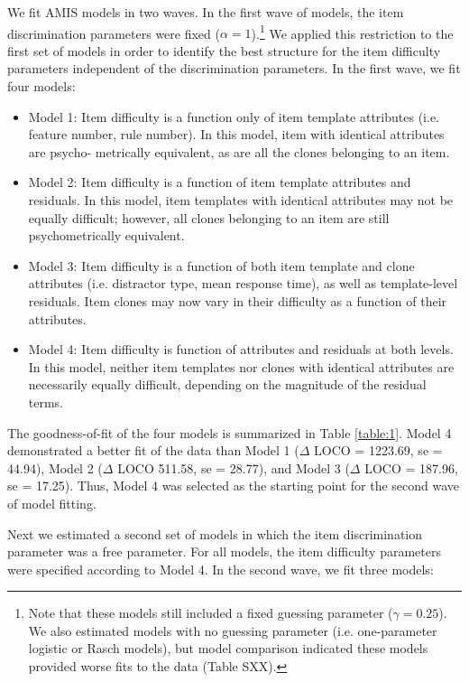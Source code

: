 \documentclass[a4paper,man,natbib]{apa6}
\begin{document}
We fit AMIS models in two waves. In the first wave of models, the item discrimination parameters were fixed ($\alpha = 1$).\footnote{Note that these models still included a fixed guessing parameter ($\gamma = 0.25$). We also estimated models with no guessing parameter (i.e. one-parameter logistic or Rasch models), but model comparison indicated these models provided worse fits to the data (Table SXX).} We applied this restriction to the first set of models in order to identify the best structure for the item difficulty parameters independent of the discrimination parameters. In the first wave, we fit four models:

\begin{itemize}

\item Model 1: Item difficulty is a function only of item template attributes (i.e. feature number, rule number). In this model, item with identical attributes are psycho- metrically equivalent, as are all the clones belonging to an item.

\item Model 2: Item difficulty is a function of item template attributes and residuals. In this model, item templates with identical attributes may not be equally difficult; however, all clones belonging to an item are still psychometrically equivalent.

\item Model 3: Item difficulty is a function of both item template and clone attributes (i.e. distractor type, mean response time), as well as template-level residuals. Item clones may now vary in their difficulty as a function of their attributes.  

\item Model 4: Item difficulty is function of attributes and residuals at both levels. In this model, neither item templates nor clones with identical attributes are necessarily equally difficult, depending on the magnitude of the residual terms.

\end{itemize}

The goodness-of-fit of the four models is summarized in Table \ref{table:1}. Model 4 demonstrated a better fit of the data than Model 1 ($\Delta$ LOCO = 1223.69, se = 44.94), Model 2 ($\Delta$ LOCO 511.58, se = 28.77), and Model 3 ($\Delta$ LOCO = 187.96, se = 17.25). Thus, Model 4 was selected as the starting point for the second wave of model fitting.

Next we estimated a second set of models in which the item discrimination parameter was a free parameter. For all models, the item difficulty parameters were specified according to Model 4. In the second wave, we fit three models:
\end{document}
